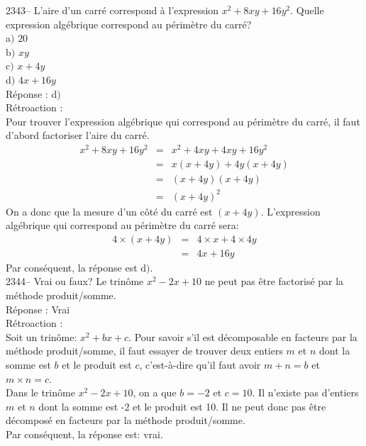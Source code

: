 \documentclass[letterpaper, 12pt]{article}
\begin{document}
2343-- L'aire d'un carr\'e correspond \`a l'expression $x^{2}+8xy+16y^{2}$. Quelle expression alg\'ebrique correspond au p\'erim\`etre du carr\'e?\\

a$)$ $20$\\
b$)$ $xy$\\
c$)$ $x+4y$\\
d$)$ $4x+16y$\\

R\'eponse : d$)$\\

R\'etroaction :\\
Pour trouver l'expression alg\'ebrique qui correspond au p\'erim\`etre du carr\'e, il faut d'abord factoriser l'aire du carr\'e.
\begin{eqnarray*}
x^{2}+8xy+16y^{2}&=&x^{2}+4xy+4xy+16y^{2}\\
&=&x(x+4y)+4y(x+4y)\\
&=&(x+4y)(x+4y)\\
&=&(x+4y)^{2}
\end{eqnarray*}
On a donc que la mesure d'un c\^ot\'e du carr\'e est $(x+4y)$. L'expression alg\'ebrique qui correspond au p\'erim\`etre du carr\'e sera:
\begin{eqnarray*}
4\times (x+4y)&=& 4\times x +4\times 4y\\
 &=& 4x +16y
\end{eqnarray*}
Par cons\'equent, la r\'eponse est d$)$.\\

2344-- Vrai ou faux? Le trin\^ome $x^{2}-2x+10$ ne peut pas \^etre factoris\'e par la m\'ethode produit/somme.\\

R\'eponse : Vrai\\

R\'etroaction :\\
Soit un trin\^ome: $x^{2}+bx+c$. Pour savoir s'il est d\'ecomposable en facteurs par la m\'ethode produit/somme, il faut essayer de trouver deux entiers $m$ et $n$ dont la somme est $b$ et le produit est $c$, c'est-\`a-dire qu'il faut avoir $m+n=b$ et $m\times n=c$.\\

Dans le trin\^ome $x^{2}-2x+10$, on a que $b=-2$ et $c=10$. Il n'existe pas d'entiers $m$ et $n$ dont la somme est -2 et le produit est 10. Il ne peut donc pas \^etre d\'ecompos\'e en facteurs par la m\'ethode produit/somme.\\
Par cons\'equent, la r\'eponse est: vrai.\\
\end{document}
